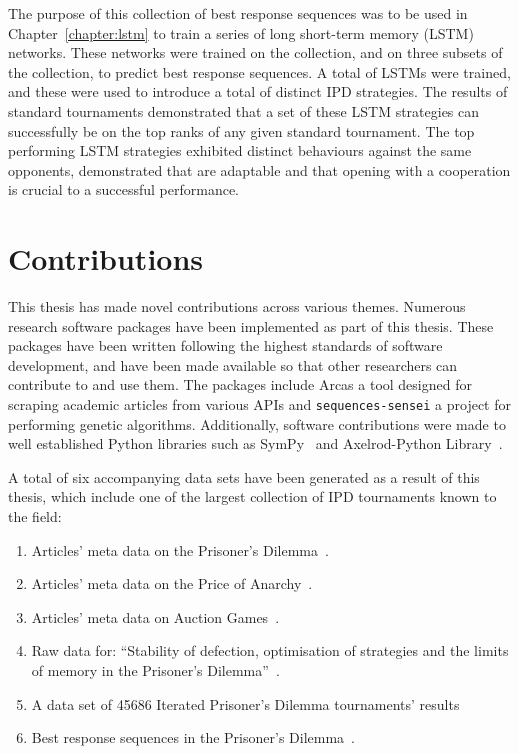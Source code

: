 The purpose of this collection of best response sequences
was to be used in Chapter~\ref{chapter:lstm} to train a series of long short-term
memory (LSTM) networks. These networks were trained on the collection, and on
three subsets of the collection, to predict best response sequences. A total
of \lstmnetworks LSTMs were trained, and these were used to introduce a total of \lstmstrategies
distinct IPD strategies. The results of \metatournamentslstm standard
tournaments demonstrated that a set of these LSTM strategies can successfully be
on the top ranks of any given standard tournament. The top performing LSTM
strategies exhibited distinct behaviours against the same opponents,
demonstrated that are adaptable and that opening with a cooperation is crucial
to a successful performance.

\section{Contributions}

This thesis has made novel contributions across various themes. Numerous
research software packages have been implemented as part of this thesis. These
packages have been written following the highest standards of software
development, and have been made available so that other researchers can
contribute to and use them. The packages include Arcas a tool designed for
scraping academic articles from various APIs and
\texttt{sequences-sensei} a project for performing genetic
algorithms. Additionally, software contributions were made to well established
Python libraries such as SymPy~\cite{sympy} and Axelrod-Python
Library~\cite{axelrodproject}.

A total of six accompanying data sets have been generated as a result of this thesis,
which include one of the largest collection of IPD
tournaments known to the field:

\begin{enumerate}
    \item Articles' meta data on the Prisoner's Dilemma~\cite{pd_data_2018}.
    \item Articles' meta data on the Price of Anarchy~\cite{anarchy_data_2018}.
    \item Articles' meta data on Auction Games~\cite{auction_data_2018}.
    \item Raw data for: ``Stability of defection, optimisation of strategies and
    the limits of memory in the Prisoner's Dilemma''~\cite{glynatsi2019}.
    \item A data set of 45686 Iterated Prisoner's Dilemma tournaments' results~\cite{Glynatsi2019_meta, Glynatsi2019_meta_raw_data}
    \item Best response sequences in the Prisoner's Dilemma~\cite{Glynatsi2020_sequences}.
\end{enumerate}

